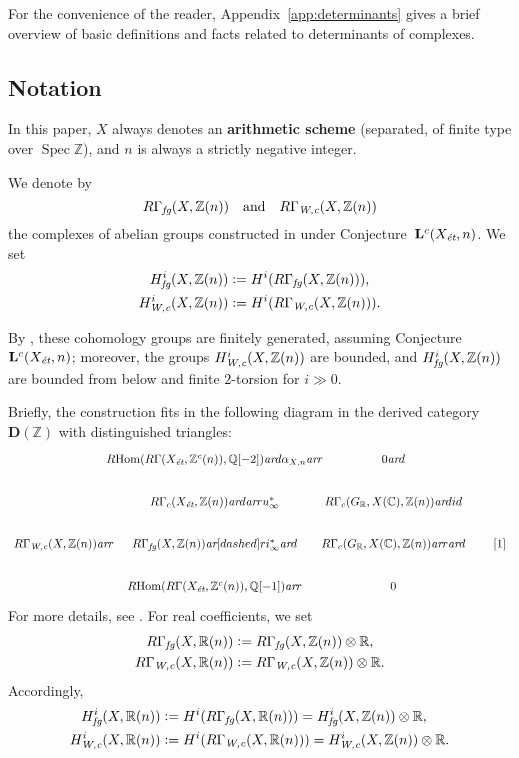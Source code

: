 \documentclass[10pt,a4paper,oneside,draft]{article}
\DeclareMathOperator{\Hom}{Hom}
\DeclareMathOperator{\Spec}{Spec}
\newcommand{\CC}{\mathbb{C}}
\newcommand{\QQ}{\mathbb{Q}}
\newcommand{\RR}{\mathbb{R}}
\newcommand{\ZZ}{\mathbb{Z}}
\newcommand{\ar}{\text{\it ar}}
\newcommand{\et}{\text{\it \'{e}t}}
\newcommand{\fg}{\text{\it fg}}
\newcommand{\Wc}{\text{\it W,c}}
\newcommand{\dfn}{\mathrel{\mathop:}=}
\newcommand{\RHom}{R\!\Hom}
\theoremstyle{myplain}
\theoremstyle{mydefinition}
\numberwithin{equation}{section}
\begin{document}
For the convenience of the reader, Appendix~\ref{app:determinants} gives a brief
overview of basic definitions and facts related to determinants of complexes.

\subsection*{Notation}

In this paper, $X$ always denotes an \textbf{arithmetic scheme} (separated, of
finite type over $\Spec \ZZ$), and $n$ is always a strictly negative integer.

We denote by
\[
  R\Gamma_\fg (X, \ZZ (n))
  \quad\text{and}\quad
  R\Gamma_\Wc (X, \ZZ (n))
\]
the complexes of abelian groups constructed in \cite{Beshenov-Weil-etale-1}
under Conjecture~$\mathbf{L}^c (X_\et,n)$. We set
\begin{align*}
  H^i_\fg (X, \ZZ (n)) & \dfn H^i (R\Gamma_\fg (X, \ZZ (n))), \\
  H^i_\Wc (X, \ZZ (n)) & \dfn H^i (R\Gamma_\Wc (X, \ZZ (n))).
\end{align*}

By \cite[Proposition 5.5, Proposition 7.12]{Beshenov-Weil-etale-1}, these
cohomology groups are finitely generated, assuming
Conjecture~$\mathbf{L}^c (X_\et,n)$; moreover, the groups $H^i_\Wc (X, \ZZ(n))$
are bounded, and $H^i_\fg (X, \ZZ (n))$ are bounded from below and finite
$2$-torsion for $i \gg 0$.

Briefly, the construction fits in the following diagram in the derived category
$\mathbf{D} (\ZZ)$ with distinguished triangles:
\[ \begin{tikzcd}[column sep=1.5em]
    &[-3em] \RHom (R\Gamma (X_\et, \ZZ^c (n)), \QQ [-2]) \ar{d}{\alpha_{X,n}} \ar{r} &[-2.5em] 0 \ar{d} \\
    & R\Gamma_c (X_\et, \ZZ(n)) \ar{d}\ar{r}{u_\infty^*} & R\Gamma_c (G_\RR, X (\CC), \ZZ(n))\ar{d}{id} \\
    R\Gamma_\Wc (X, \ZZ (n)) \ar{r} & R\Gamma_\fg (X, \ZZ(n)) \ar[dashed]{r}{i_\infty^*}\ar{d} & R\Gamma_c (G_\RR, X (\CC), \ZZ(n)) \ar{r} \ar{d} & {[1]} \\
    & \RHom (R\Gamma (X_\et, \ZZ^c (n)), \QQ [-1]) \ar{r} & 0
\end{tikzcd} \]
For more details, see \cite{Beshenov-Weil-etale-1}.
For real coefficients, we set
\begin{align*}
  R\Gamma_\fg (X, \RR (n)) & \dfn R\Gamma_\fg (X, \ZZ (n)) \otimes \RR, \\
  R\Gamma_\Wc (X, \RR (n)) & \dfn R\Gamma_\Wc (X, \ZZ (n)) \otimes \RR.
\end{align*}
Accordingly,
\begin{align*}
  H^i_\fg (X, \RR (n)) & \dfn H^i (R\Gamma_\fg (X, \RR (n))) = H^i_\fg (X, \ZZ (n)) \otimes \RR, \\
  H^i_\Wc (X, \RR (n)) & \dfn H^i (R\Gamma_\Wc (X, \RR (n))) = H^i_\Wc (X, \ZZ (n)) \otimes \RR.
\end{align*}
\end{document}

